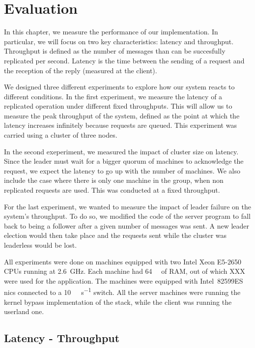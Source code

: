 \chapter{Evaluation}
\label{chap:evaluation}

In this chapter, we measure the performance of our implementation.
In particular, we will focus on two key characteristics: latency and throughput.
Throughput is defined as the number of messages than can be succesfully replicated per second.
Latency is the time between the sending of a request and the reception of the reply (measured at the client).

We designed three different experiments to explore how our system reacts to different conditions.
In the first experiment, we measure the latency of a replicated operation under different fixed throughputs.
This will allow us to measure the peak throughput of the system, defined as the point at which the latency increases infinitely because requests are queued.
This experiment was carried using a cluster of three nodes.

In the second exeperiment, we measured the impact of cluster size on latency.
Since the leader must wait for a bigger quorum of machines to acknowledge the request, we expect the latency to go up with the number of machines.
We also include the case where there is only one machine in the group, \ie when non replicated requests are used.
This was conducted at a fixed throughput.

For the last experiment, we wanted to measure the impact of leader failure on the system's throughput.
To do so, we modified the code of the server program to fall back to being a follower after a given number of messages was sent.
A new leader election would then take place and the requests sent while the cluster was leaderless would be lost.

All experiments were done on machines equipped with two Intel Xeon E5-2650 CPUs running at \SI{2.6}{\giga\hertz}.
Each machine had \SI{64}{\giga\byte} of RAM, out of which XXX were used for the application. %
The machines were equipped with Intel~82599ES \glspl{nic} connected to a \SI{10}{\giga\bit\per\second} switch.
All the server machines were running the kernel bypass implementation of the stack, while the client was running the userland one.

\section{Latency - Throughput}

